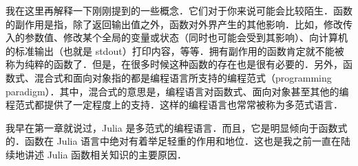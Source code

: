 我在这里再解释一下刚刚提到的一些概念．它们对于你来说可能会比较陌生．函数的副作用是指，除了返回输出值之外，函数对外界产生的其他影响．比如，修改传入的参数值、修改某个全局的变量或状态（同时也可能会受到其影响）、向计算机的标准输出（也就是 stdout）打印内容，等等．拥有副作用的函数肯定就不能被称为纯粹的函数了．但是，在很多时候这种函数的存在也是很有必要的．另外，函数式、混合式和面向对象指的都是编程语言所支持的编程范式（programming paradigm）．其中，混合式的意思是，编程语言对函数式、面向对象甚至其他的编程范式都提供了一定程度上的支持．这样的编程语言也常常被称为多范式语言．

我早在第一章就说过，Julia 是多范式的编程语言．而且，它是明显倾向于函数式的．函数在 Julia 语言中绝对有着举足轻重的作用和地位．这也是我之前一直在陆续地讲述 Julia 函数相关知识的主要原因．